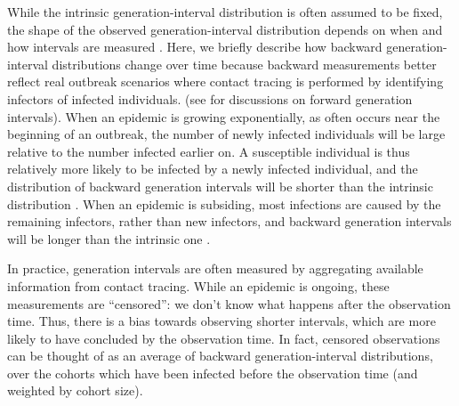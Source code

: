 \documentclass[12pt]{article}
\begin{document}
While the intrinsic generation-interval distribution is often assumed to be fixed, the shape of the observed generation-interval distribution depends on when and how intervals are measured \citep{kenah2008generation, nishiura2010time, tomba2010some, champredon2015intrinsic, britton2019estimation}. 
Here, we briefly describe how backward generation-interval distributions change over time because backward measurements better reflect real outbreak scenarios where contact tracing is performed by identifying infectors of infected individuals. (see \cite{kenah2008generation, nishiura2010time, tomba2010some, champredon2015intrinsic} for discussions on forward generation intervals).
When an epidemic is growing exponentially, as often occurs near the beginning of an outbreak, the number of newly infected individuals will be large relative to the number infected earlier on. 
A susceptible individual is thus relatively more likely to be infected by a newly infected individual, 
and the distribution of backward generation intervals will be shorter than the intrinsic distribution \citep{nishiura2010time, champredon2015intrinsic, britton2019estimation}.
When an epidemic is subsiding, most infections are caused by the remaining infectors, rather than new infectors, and backward generation intervals will be longer than the intrinsic one \citep{nishiura2010time, tomba2010some, champredon2015intrinsic}.

In practice, generation intervals are often measured by aggregating available information from contact tracing. 
While an epidemic is ongoing, these measurements are ``censored'': we don't know what happens after the observation time.
Thus, there is a bias towards observing shorter intervals, which are more likely to have concluded by the observation time.
In fact, censored observations can be thought of as an average of backward generation-interval distributions, over the cohorts which have been infected before the observation time (and weighted by cohort size).
\end{document}
